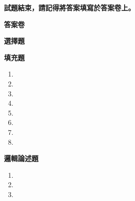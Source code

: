 \documentclass[a4paper, 12pt, addpoints]{exam}
\begin{document}
\begin{center}
    \textbf{\Large 試題結束，請記得將答案填寫於答案卷上。}
\end{center}

\newpage

\begin{center}
    \huge \textbf{答案卷}
\end{center}

\noindent \large \textbf{選擇題}
\begin{table}[H]
\end{table}

\noindent \large \textbf{填充題}
\begin{multicols}{2}
\begin{enumerate}[leftmargin=*]
    \item \makebox[0.3\textwidth]{\enspace\hrulefill}
    \item \makebox[0.3\textwidth]{\enspace\hrulefill}
    \item \makebox[0.3\textwidth]{\enspace\hrulefill}
    \item \makebox[0.3\textwidth]{\enspace\hrulefill}
    \item {}
    \item \makebox[0.3\textwidth]{\enspace\hrulefill}
    \item \makebox[0.3\textwidth]{\enspace\hrulefill}
    \item \makebox[0.3\textwidth]{\enspace\hrulefill}
\end{enumerate}
\end{multicols}

\noindent \large \textbf{邏輯論述題}

\begin{enumerate}[leftmargin=*]
    \item \hspace{1em}  
    \fillwithlines{8em}
    \item \hspace{1em}  
    \fillwithlines{8em}
    \item \hspace{1em}  
    \fillwithlines{8em}
   
\end{enumerate}
\end{document}
